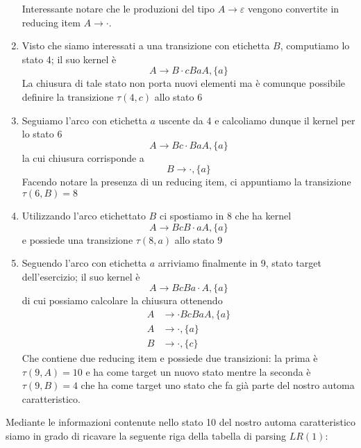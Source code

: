 \documentclass[class=book, crop=false, oneside, 12pt]{standalone}
\begin{document}
\begin{enumerate}
    Interessante notare che le produzioni del tipo \(A \to \varepsilon\) vengono convertite in reducing item \(A \to \cdot\).
    \item Visto che siamo interessati a una transizione con etichetta \(B\), computiamo lo stato 4; il suo kernel è 
    \begin{equation*}
        A \to B \cdot cBaA, \{a\} 
    \end{equation*}
    La chiusura di tale stato non porta nuovi elementi ma è comunque possibile definire la transizione \(\tau(4,c)\) allo stato 6
    \item Seguiamo l'arco con etichetta \(a\) uscente da 4 e calcoliamo dunque il kernel per lo stato 6
    \begin{equation*}
        A \to Bc \cdot BaA, \{a\} 
    \end{equation*}
    la cui chiusura corrisponde a 
    \begin{equation*}
         B \to \cdot, \{a\} 
    \end{equation*}
    Facendo notare la presenza di un reducing item, ci appuntiamo la transizione \(\tau(6, B)=8\)
    \item Utilizzando l'arco etichettato \(B\) ci spostiamo in 8 che ha kernel
    \begin{equation*}
        A \to BcB \cdot aA, \{a\} 
    \end{equation*}
    e possiede una transizione \(\tau(8, a)\) allo stato 9
    \item Seguendo l'arco con etichetta \(a\) arriviamo finalmente in 9, stato target dell'esercizio; il suo kernel è
    \begin{equation*}
        A \to BcBa \cdot A, \{a\} 
    \end{equation*}
    di cui possiamo calcolare la chiusura ottenendo
    \begin{align*}
        A &\to \cdot BcBaA, \{a\} \\
        A &\to \cdot, \{a\} \\
        B &\to \cdot, \{c\}
    \end{align*}
    Che contiene due reducing item e possiede due transizioni: la prima è \(\tau(9, A)=10\) e ha come target un nuovo stato mentre la seconda è \(\tau(9, B)=4\) che ha come target uno stato che fa già parte del nostro automa caratteristico.
\end{enumerate}

Mediante le informazioni contenute nello stato 10 del nostro automa caratteristico siamo in grado di ricavare la seguente riga della tabella di parsing \(LR(1)\):
\end{document}
